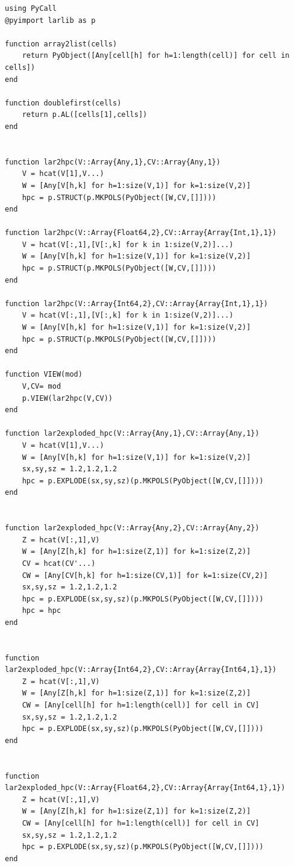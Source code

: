 \documentclass{article}
\begin{document}
\begin{flushleft}\small
\begin{list}{}{}\item
\begin{Verbatim}[tabsize=4]
using PyCall
@pyimport larlib as p

function array2list(cells) 
	return PyObject([Any[cell[h] for h=1:length(cell)] for cell in cells])
end

function doublefirst(cells)
	return p.AL([cells[1],cells])
end


function lar2hpc(V::Array{Any,1},CV::Array{Any,1})
	V = hcat(V[1],V...)
	W = [Any[V[h,k] for h=1:size(V,1)] for k=1:size(V,2)]
	hpc = p.STRUCT(p.MKPOLS(PyObject([W,CV,[]])))
end

function lar2hpc(V::Array{Float64,2},CV::Array{Array{Int,1},1})
	V = hcat(V[:,1],[V[:,k] for k in 1:size(V,2)]...)
	W = [Any[V[h,k] for h=1:size(V,1)] for k=1:size(V,2)]
	hpc = p.STRUCT(p.MKPOLS(PyObject([W,CV,[]])))
end
	
function lar2hpc(V::Array{Int64,2},CV::Array{Array{Int,1},1})
	V = hcat(V[:,1],[V[:,k] for k in 1:size(V,2)]...)
	W = [Any[V[h,k] for h=1:size(V,1)] for k=1:size(V,2)]
	hpc = p.STRUCT(p.MKPOLS(PyObject([W,CV,[]])))
end

function VIEW(mod)
	V,CV= mod
	p.VIEW(lar2hpc(V,CV))
end

function lar2exploded_hpc(V::Array{Any,1},CV::Array{Any,1})
	V = hcat(V[1],V...)
	W = [Any[V[h,k] for h=1:size(V,1)] for k=1:size(V,2)]
	sx,sy,sz = 1.2,1.2,1.2
	hpc = p.EXPLODE(sx,sy,sz)(p.MKPOLS(PyObject([W,CV,[]])))
end

	
function lar2exploded_hpc(V::Array{Any,2},CV::Array{Any,2})
	Z = hcat(V[:,1],V)
	W = [Any[Z[h,k] for h=1:size(Z,1)] for k=1:size(Z,2)]
	CV = hcat(CV'...)
	CW = [Any[CV[h,k] for h=1:size(CV,1)] for k=1:size(CV,2)]
	sx,sy,sz = 1.2,1.2,1.2
	hpc = p.EXPLODE(sx,sy,sz)(p.MKPOLS(PyObject([W,CV,[]])))
	hpc = hpc
end

	
function lar2exploded_hpc(V::Array{Int64,2},CV::Array{Array{Int64,1},1})
	Z = hcat(V[:,1],V)
	W = [Any[Z[h,k] for h=1:size(Z,1)] for k=1:size(Z,2)]
	CW = [Any[cell[h] for h=1:length(cell)] for cell in CV]
	sx,sy,sz = 1.2,1.2,1.2
	hpc = p.EXPLODE(sx,sy,sz)(p.MKPOLS(PyObject([W,CV,[]])))
end

	
function lar2exploded_hpc(V::Array{Float64,2},CV::Array{Array{Int64,1},1})
	Z = hcat(V[:,1],V)
	W = [Any[Z[h,k] for h=1:size(Z,1)] for k=1:size(Z,2)]
	CW = [Any[cell[h] for h=1:length(cell)] for cell in CV]
	sx,sy,sz = 1.2,1.2,1.2
	hpc = p.EXPLODE(sx,sy,sz)(p.MKPOLS(PyObject([W,CV,[]])))
end
	

\end{Verbatim}
\end{list}
\end{flushleft}
\end{document}
